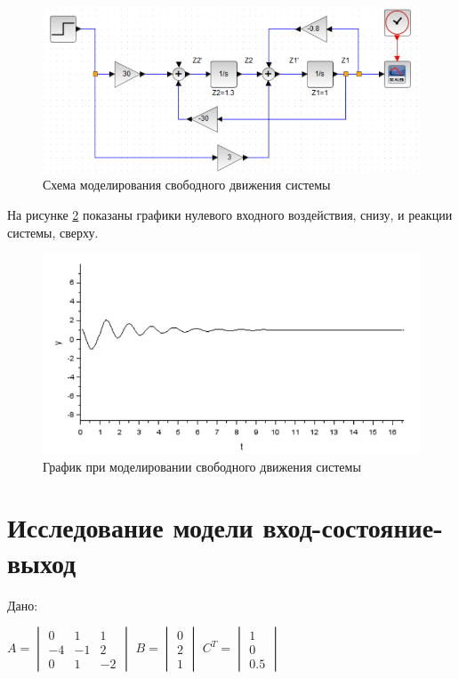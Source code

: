 \documentclass[a4paper, 12pt]{article}
\begin{document}
\begin{figure}[h!]
	\centering
	\includegraphics[scale=0.6]{scheme2}
	\caption{Схема моделирования свободного движения системы}
	\label{p:Схема2}
\end{figure}

На рисунке \ref{p:График2} показаны графики нулевого входного воздействия, снизу, и реакции системы, сверху.

\begin{figure}[h!]
	\centering
	\includegraphics[scale=0.7]{plot2}
	\caption{График при моделировании свободного движения системы}
	\label{p:График2}
\end{figure}

\newpage
\section{Исследование модели вход-состояние-выход}

Дано: \\
\begin{center}
$ A = \begin{vmatrix}
0 & 1 & 1\\
-4 & -1 & 2\\
0 & 1 & -2
\end{vmatrix}  $
$ B = \begin{vmatrix}
0\\ 2\\ 1
\end{vmatrix}
$
$ C^T = \begin{vmatrix}
1\\ 0\\ 0.5
\end{vmatrix} $
\end{center}
\end{document}
